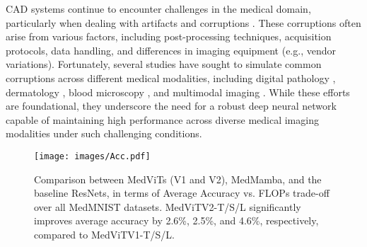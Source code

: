\documentclass[times,twocolumn,final]{elsarticle}
\begin{document}

CAD systems continue to encounter challenges in the medical domain, particularly when dealing with artifacts \cite{eisenstein2024pushing, sacher2024role} and corruptions \cite{huang2023assessing}. These corruptions often arise from various factors, including post-processing techniques, acquisition protocols, data handling, and differences in imaging equipment (e.g., vendor variations). Fortunately, several studies have sought to simulate common corruptions across different medical modalities, including digital pathology \cite{zhang2022benchmarking},  dermatology \cite{maron2021benchmark}, blood microscopy \cite{zhang2020corruption}, and multimodal imaging \cite{di2024medmnist}. While these efforts are foundational, they underscore the need for a robust deep neural network capable of maintaining high performance across diverse medical imaging modalities under such challenging conditions.


\begin{figure}[!]
    \centering
    \texttt{[image: images/Acc.pdf]}
    \caption{Comparison between MedViTs (V1 and V2), MedMamba, and the baseline ResNets, in terms of Average Accuracy vs. FLOPs trade-off over all MedMNIST datasets. MedViTV2-T/S/L significantly improves average accuracy by 2.6\%, 2.5\%, and 4.6\%, respectively, compared to MedViTV1-T/S/L.}
    \label{fig:lineplot}
    \vspace{-1em}
\end{figure}
\end{document}
